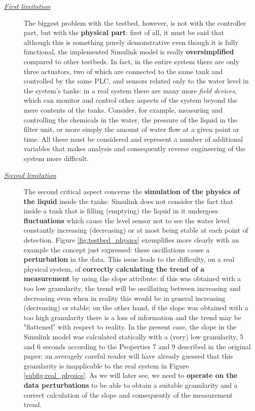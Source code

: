 \begin{description}
	\item[\emph{\underline{First limitation}}] The biggest problem with the testbed, however, is not with the controller part, but with the \textbf{physical part}: first of all, it must be said that although this is something purely demonstrative even though it is fully functional, the implemented Simulink model is really \textbf{oversimplified} compared to other testbeds. In fact, in the entire system there are only three actuators, two of which are connected to the same tank and controlled by the same PLC, and sensors related only to the water level in the system's tanks: in a real system there are many more \textit{field devices}, which can monitor and control other aspects of the system beyond the mere contents of the tanks. Consider, for example, measuring and controlling the chemicals in the water, the pressure of the liquid in the filter unit, or more simply the amount of water flow at a given point or time.\newline
	All these must be considered and represent a number of additional variables that makes analysis and consequently reverse engineering of the system more difficult.
	
	\item[\emph{\underline{Second limitation}}] The second critical aspect concerns the \textbf{simulation of the physics of the liquid} inside the tanks: Simulink does not consider the fact that inside a tank that is filling (emptying) the liquid in it undergoes \textbf{fluctuations} which cause the level sensor not to see the water level constantly increasing (decreasing) or at most being stable at each point of detection. Figure \ref{fig:testbed_physics} exemplifies more clearly with an example the concept just expressed: these oscillations cause a \textbf{perturbation} in the data.\newline
	This issue leads to the difficulty, on a real physical system, of \textbf{correctly calculating the trend of a measurement} by using the slope attribute: if this was obtained with a too low granularity, the trend will be oscillating between increasing and decreasing even when in reality this would be in general increasing (decreasing) or stable; on the other hand, if the slope was obtained with a too high granularity there is a loss of information and the trend may be "flattened" with respect to reality.\newline
	In the present case, the slope in the Simulink model was calculated statically with a (very) low granularity, 5 and 6 seconds according to the Properties 7 and 9 described in the original paper: an averagely careful reader will have already guessed that this granularity is inapplicable to the real system in Figure \ref{subfig:real_physics}. As we will later see, we need to \textbf{operate on the data perturbations} to be able to obtain a suitable granularity and a correct calculation of the slope and consequently of the measurement trend.
\end{description}
\vfill

